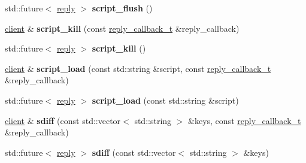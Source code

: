 \begin{DoxyCompactItemize}
\item 
\mbox{\label{classcpp__redis_1_1client_a44f5707f8487285d69737b7857c436d7}} 
std\+::future$<$ \hyperlink{classcpp__redis_1_1reply}{reply} $>$ {\bfseries script\+\_\+flush} ()
\item 
\mbox{\label{classcpp__redis_1_1client_a65abffc1a1669931d5b6715f354b59af}} 
\hyperlink{classcpp__redis_1_1client}{client} \& {\bfseries script\+\_\+kill} (const \hyperlink{classcpp__redis_1_1client_a061a1140d36d2eaeda82b09a0bb3f9f2}{reply\+\_\+callback\+\_\+t} \&reply\+\_\+callback)
\item 
\mbox{\label{classcpp__redis_1_1client_a35286249f2405afa0cf412472c1067b4}} 
std\+::future$<$ \hyperlink{classcpp__redis_1_1reply}{reply} $>$ {\bfseries script\+\_\+kill} ()
\item 
\mbox{\label{classcpp__redis_1_1client_a1c1d1b3daff14dc29c32d1ea8407efdb}} 
\hyperlink{classcpp__redis_1_1client}{client} \& {\bfseries script\+\_\+load} (const std\+::string \&script, const \hyperlink{classcpp__redis_1_1client_a061a1140d36d2eaeda82b09a0bb3f9f2}{reply\+\_\+callback\+\_\+t} \&reply\+\_\+callback)
\item 
\mbox{\label{classcpp__redis_1_1client_a2c42d83c0bfcb46d41d2c205d808e6c8}} 
std\+::future$<$ \hyperlink{classcpp__redis_1_1reply}{reply} $>$ {\bfseries script\+\_\+load} (const std\+::string \&script)
\item 
\mbox{\label{classcpp__redis_1_1client_a9d70980e8fc5c90f218c5fd2215bed89}} 
\hyperlink{classcpp__redis_1_1client}{client} \& {\bfseries sdiff} (const std\+::vector$<$ std\+::string $>$ \&keys, const \hyperlink{classcpp__redis_1_1client_a061a1140d36d2eaeda82b09a0bb3f9f2}{reply\+\_\+callback\+\_\+t} \&reply\+\_\+callback)
\item 
\mbox{\label{classcpp__redis_1_1client_a93ff7c295d6147d3d452364533a19de9}} 
std\+::future$<$ \hyperlink{classcpp__redis_1_1reply}{reply} $>$ {\bfseries sdiff} (const std\+::vector$<$ std\+::string $>$ \&keys)
\item 
\mbox{\label{classcpp__redis_1_1client_a0f896b36f3284d66bb1679f535378bf5}} 

\end{DoxyCompactItemize}
